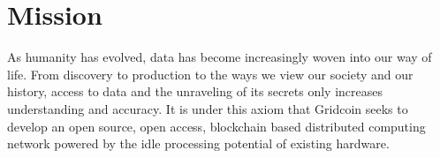 \section{Mission}

\label{sec:mission}

As humanity has evolved, data has become increasingly woven into our way of life.  From discovery to production to the ways we view our society and our history, access to data and the unraveling of its secrets only increases understanding and accuracy.  It is under this axiom that Gridcoin seeks to develop an open source, open access, blockchain based distributed computing network powered by the idle processing potential of existing hardware.